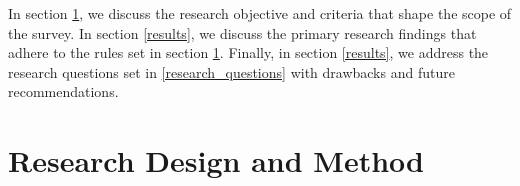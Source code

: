 \documentclass[conference]{IEEEtran}
\begin{document}

In section \ref{research_method}, we discuss the research objective and criteria that shape the scope of the survey. In section \ref{results}, we discuss the primary research findings that adhere to the rules set in section \ref{research_method}. Finally, in section \ref{results}, we address the research questions set in \ref{research_questions} with drawbacks and future recommendations.

\section{Research Design and Method}
\label{research_method}
\end{document}
